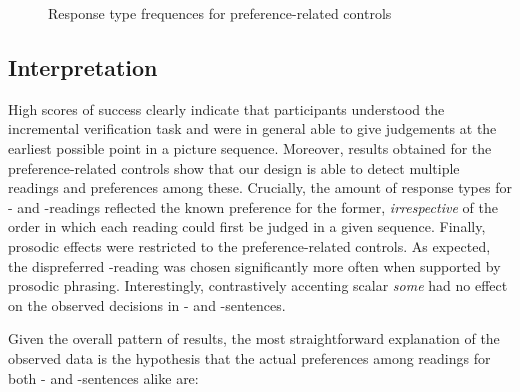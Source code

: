\documentclass[fleqn,reqno,10pt,draft]{article}
\newcommand{\as}{\acro{as}}
\renewcommand{\es}{\acro{es}}
\newcommand{\lc}{\acro{lc}}
\newcommand{\ec}{\acro{ec}}
\begin{document}
\begin{figure}[t]
{
}
  \caption{Response type frequences for preference-related controls}
  \label{fig:response-type-freque-TRF}
\end{figure}


\subsection{Interpretation}
\label{sec:interpretation}


High scores of success clearly indicate that participants understood 
the incremental verification task and were in general able to give 
judgements at the earliest possible point in a picture sequence. 
Moreover, results obtained for the preference-related controls  
show that our design is able to detect multiple readings and preferences 
among these. Crucially, the amount of response types for \lc- and \ec-readings 
reflected the known preference for the former, \emph{irrespective} of the 
order in which each reading could first be judged in a given sequence. 
Finally, prosodic effects were restricted to the preference-related 
controls. As expected, the dispreferred \ec-reading was chosen 
significantly more often when supported by prosodic phrasing. Interestingly, 
contrastively accenting scalar \emph{some} had no effect on the observed 
decisions in \as- and \es-sentences.

Given the overall pattern of results, the most straightforward 
explanation of the observed data is the hypothesis that the actual 
preferences among readings for both \as- and \es-sentences alike are:
\end{document}
